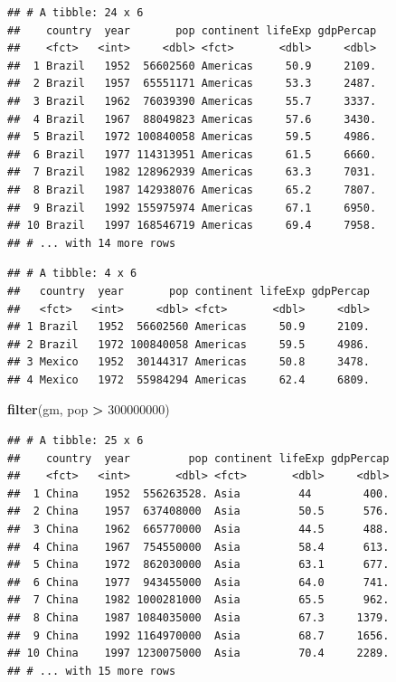 \documentclass[]{article}
\newenvironment{Shaded}{\begin{snugshade}}{\end{snugshade}}
\newcommand{\KeywordTok}[1]{\textcolor[rgb]{0.13,0.29,0.53}{\textbf{#1}}}
\newcommand{\DecValTok}[1]{\textcolor[rgb]{0.00,0.00,0.81}{#1}}
\newcommand{\StringTok}[1]{\textcolor[rgb]{0.31,0.60,0.02}{#1}}
\newcommand{\OperatorTok}[1]{\textcolor[rgb]{0.81,0.36,0.00}{\textbf{#1}}}
\newcommand{\NormalTok}[1]{#1}
\begin{document}
\begin{verbatim}
## # A tibble: 24 x 6
##    country  year       pop continent lifeExp gdpPercap
##    <fct>   <int>     <dbl> <fct>       <dbl>     <dbl>
##  1 Brazil   1952  56602560 Americas     50.9     2109.
##  2 Brazil   1957  65551171 Americas     53.3     2487.
##  3 Brazil   1962  76039390 Americas     55.7     3337.
##  4 Brazil   1967  88049823 Americas     57.6     3430.
##  5 Brazil   1972 100840058 Americas     59.5     4986.
##  6 Brazil   1977 114313951 Americas     61.5     6660.
##  7 Brazil   1982 128962939 Americas     63.3     7031.
##  8 Brazil   1987 142938076 Americas     65.2     7807.
##  9 Brazil   1992 155975974 Americas     67.1     6950.
## 10 Brazil   1997 168546719 Americas     69.4     7958.
## # ... with 14 more rows
\end{verbatim}

\begin{Shaded}
\end{Shaded}

\begin{verbatim}
## # A tibble: 4 x 6
##   country  year       pop continent lifeExp gdpPercap
##   <fct>   <int>     <dbl> <fct>       <dbl>     <dbl>
## 1 Brazil   1952  56602560 Americas     50.9     2109.
## 2 Brazil   1972 100840058 Americas     59.5     4986.
## 3 Mexico   1952  30144317 Americas     50.8     3478.
## 4 Mexico   1972  55984294 Americas     62.4     6809.
\end{verbatim}

\begin{Shaded}
\begin{Highlighting}[]
\KeywordTok{filter}\NormalTok{(gm, pop }\OperatorTok{>}\StringTok{ }\DecValTok{300000000}\NormalTok{)}
\end{Highlighting}
\end{Shaded}

\begin{verbatim}
## # A tibble: 25 x 6
##    country  year         pop continent lifeExp gdpPercap
##    <fct>   <int>       <dbl> <fct>       <dbl>     <dbl>
##  1 China    1952  556263528. Asia         44        400.
##  2 China    1957  637408000  Asia         50.5      576.
##  3 China    1962  665770000  Asia         44.5      488.
##  4 China    1967  754550000  Asia         58.4      613.
##  5 China    1972  862030000  Asia         63.1      677.
##  6 China    1977  943455000  Asia         64.0      741.
##  7 China    1982 1000281000  Asia         65.5      962.
##  8 China    1987 1084035000  Asia         67.3     1379.
##  9 China    1992 1164970000  Asia         68.7     1656.
## 10 China    1997 1230075000  Asia         70.4     2289.
## # ... with 15 more rows
\end{verbatim}
\end{document}
